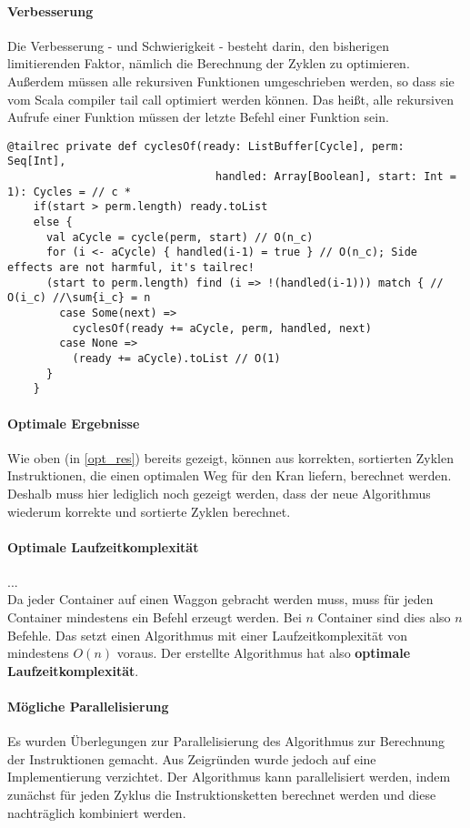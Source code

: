 \paragraph{Verbesserung}
\label{fast_cycler}
Die Verbesserung - und Schwierigkeit - besteht darin, den bisherigen limitierenden Faktor, nämlich die Berechnung der Zyklen zu optimieren.
Außerdem müssen alle rekursiven Funktionen umgeschrieben werden, so dass sie vom Scala compiler tail call optimiert werden können.
Das heißt, alle rekursiven Aufrufe einer Funktion müssen der letzte Befehl einer Funktion sein.
\begin{lstlisting}
@tailrec private def cyclesOf(ready: ListBuffer[Cycle], perm: Seq[Int],
                                handled: Array[Boolean], start: Int = 1): Cycles = // c *
    if(start > perm.length) ready.toList
    else {
      val aCycle = cycle(perm, start) // O(n_c)
      for (i <- aCycle) { handled(i-1) = true } // O(n_c); Side effects are not harmful, it's tailrec!
      (start to perm.length) find (i => !(handled(i-1))) match { // O(i_c) //\sum{i_c} = n
        case Some(next) =>
          cyclesOf(ready += aCycle, perm, handled, next)
        case None =>
          (ready += aCycle).toList // O(1)
      }
    }
\end{lstlisting}


\paragraph{Optimale Ergebnisse}
Wie oben (in \ref{opt_res}) bereits gezeigt, können aus korrekten, sortierten Zyklen Instruktionen, die einen optimalen Weg für den Kran liefern, berechnet werden.
Deshalb muss hier lediglich noch gezeigt werden, dass der neue Algorithmus wiederum korrekte und sortierte Zyklen berechnet. \\

\paragraph{Optimale Laufzeitkomplexität}
... \\
Da jeder Container auf einen Waggon gebracht werden muss, muss für jeden Container mindestens ein Befehl erzeugt werden.
Bei $n$ Container sind dies also $n$ Befehle. Das setzt einen Algorithmus mit einer Laufzeitkomplexität von mindestens $O(n)$ voraus.
Der erstellte Algorithmus hat also \textbf{optimale Laufzeitkomplexität}.

\paragraph{Mögliche Parallelisierung}
Es wurden Überlegungen zur Parallelisierung des Algorithmus zur Berechnung der Instruktionen gemacht.
Aus Zeigründen wurde jedoch auf eine Implementierung verzichtet.
Der Algorithmus kann parallelisiert werden,
indem zunächst für jeden Zyklus die Instruktionsketten berechnet werden und diese nachträglich kombiniert werden.


